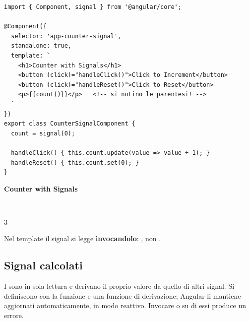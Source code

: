 \begin{affianco}[0.52][c]
\codicepiccolo
\begin{lstlisting}[style=ts, name=counter-signal.component.ts]
import { Component, signal } from '@angular/core';

@Component({
  selector: 'app-counter-signal',
  standalone: true,
  template: `
    <h1>Counter with Signals</h1>
    <button (click)="handleClick()">Click to Increment</button>
    <button (click)="handleReset()">Click to Reset</button>
    <p>{{count()}}</p>   <!-- si notino le parentesi! -->
  `
})
export class CounterSignalComponent {
  count = signal(0);

  handleClick() { this.count.update(value => value + 1); }
  handleReset() { this.count.set(0); }
}
\end{lstlisting}
\risultato
\begin{browser}[localhost:4200]
  {\Lora\bfseries\LARGE Counter with Signals\par}\vspace{6pt}
  \,\par\vspace{6pt}
  3
\end{browser}
\begin{immagine}
\end{immagine}
\end{affianco}

Nel template il signal si legge \textbf{invocandolo}: , non
.

\subsection{Signal calcolati}

I  sono in sola lettura e derivano il proprio valore da
quello di altri signal. Si definiscono con la funzione  e una
funzione di derivazione; Angular li mantiene aggiornati automaticamente, in modo
reattivo. Invocare  o  su di essi produce un
errore.

